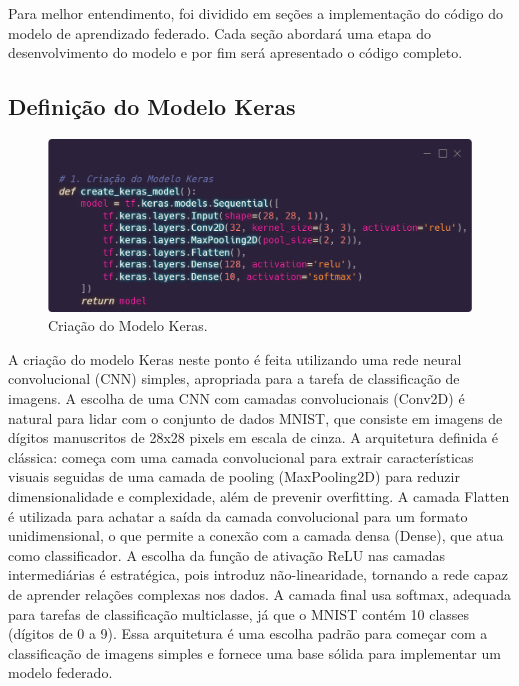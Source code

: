 Para melhor entendimento, foi dividido em seções a implementação do código do modelo de aprendizado federado. Cada seção abordará uma etapa do desenvolvimento do modelo e por fim será apresentado o código completo.

\subsection{Definição do Modelo Keras}

\begin{figure}[ht]
    \centering
    \includegraphics[scale=0.25]{figuras/desenvolvimento/kerasModel.eps}
    \caption{Criação do Modelo Keras.}
    \label{fig:kerasModel}
\end{figure}

A criação do modelo Keras neste ponto é feita utilizando uma rede neural convolucional (CNN) simples, apropriada para a tarefa de classificação de imagens. A escolha de uma CNN com camadas convolucionais (Conv2D) é natural para lidar com o conjunto de dados MNIST, que consiste em imagens de dígitos manuscritos de 28x28 pixels em escala de cinza. A arquitetura definida é clássica: começa com uma camada convolucional para extrair características visuais seguidas de uma camada de pooling (MaxPooling2D) para reduzir dimensionalidade e complexidade, além de prevenir overfitting. A camada Flatten é utilizada para achatar a saída da camada convolucional para um formato unidimensional, o que permite a conexão com a camada densa (Dense), que atua como classificador. A escolha da função de ativação ReLU nas camadas intermediárias é estratégica, pois introduz não-linearidade, tornando a rede capaz de aprender relações complexas nos dados. A camada final usa softmax, adequada para tarefas de classificação multiclasse, já que o MNIST contém 10 classes (dígitos de 0 a 9). Essa arquitetura é uma escolha padrão para começar com a classificação de imagens simples e fornece uma base sólida para implementar um modelo federado.

